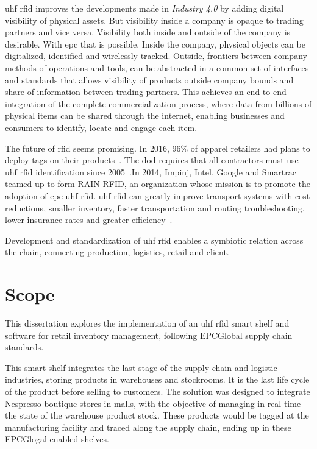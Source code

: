 \ac{uhf} \ac{rfid} improves the developments made in \emph{Industry 4.0} by adding digital visibility of physical assets. But visibility inside a company is opaque to trading partners and vice versa. Visibility both inside and outside of the company is desirable. With \ac{epc} that is possible. Inside the company, physical objects can be digitalized, identified and wirelessly tracked. Outside, frontiers between company methods of operations and tools, can be abstracted in a common set of interfaces and standards that allows visibility of products outside company bounds and share of information between trading partners.
This achieves an end-to-end integration of the complete commercialization process, where data from billions of physical items can be shared through the internet, enabling businesses and consumers to identify, locate and engage each item.

The future of \ac{rfid} seems promising. In 2016, 96\% of apparel retailers had plans to deploy tags on their products~\cite{hardgrave2016StateRFID}. The \ac{dod} requires that all contractors must use \ac{uhf} \ac{rfid} identification since 2005~\cite{DODReleasesFinal}.In 2014, Impinj, Intel, Google and Smartrac teamed up to form RAIN RFID, an organization whose mission is to promote the adoption of \acs{epc} \ac{uhf} \ac{rfid}. \ac{uhf} \ac{rfid} can greatly improve transport systems with cost reductions, smaller inventory, faster transportation and routing troubleshooting, lower insurance rates and greater efficiency~\cite{oanaRFIDTechnologyContainers2013}.

Development and standardization of \ac{uhf} \ac{rfid} enables a symbiotic relation across the chain, connecting production, logistics, retail and client.

\section{Scope}

This dissertation explores the implementation of an \ac{uhf} \ac{rfid} smart shelf and software for retail inventory management, following EPCGlobal supply chain standards. 

This smart shelf integrates the last stage of the supply chain and logistic industries, storing products in warehouses and stockrooms. It is the last life cycle of the product before selling to customers.
The solution was designed to integrate Nespresso boutique stores in malls, with the objective of managing in real time the state of the warehouse product stock.
These products would be tagged at the manufacturing facility and traced along the supply chain, ending up in these EPCGlogal-enabled shelves.

